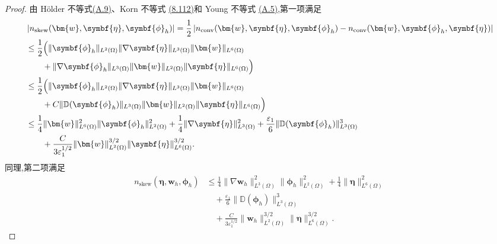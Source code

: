 \begin{lemma}[非线性对流项的估计]
\begin{proof}
由 Hölder 不等式\hyperref[eq:appendix-a-9]{(A.9)}、Korn 不等式
\hyperref[eq:smagorinsky-generalized-korn-inequality]{(8.112)}和 Young 不等式
\hyperref[eq:appendix-a-5]{(A.5)},第一项满足
\begin{equation}\label{eq:smagorinsky-error-convection-first-bound}
\begin{aligned}
&\left|n_{\mathrm{skew}}(\bm{w},\symbf{\eta},\symbf{\phi}_h)\right|
 =\frac12\left|n_{\mathrm{conv}}(\bm{w},\symbf{\eta},\symbf{\phi}_h)
 -n_{\mathrm{conv}}(\bm{w},\symbf{\phi}_h,\symbf{\eta})\right|\\
&\le\frac12\Bigl(\|\symbf{\phi}_h\|_{L^2(\Omega)}
       \|\nabla\symbf{\eta}\|_{L^3(\Omega)}\|\bm{w}\|_{L^6(\Omega)}\\
&\qquad+\|\nabla\symbf{\phi}_h\|_{L^3(\Omega)}
       \|\bm{w}\|_{L^2(\Omega)}\|\symbf{\eta}\|_{L^6(\Omega)}\Bigr)\\
&\le\frac12\Bigl(\|\symbf{\phi}_h\|_{L^2(\Omega)}
       \|\nabla\symbf{\eta}\|_{L^3(\Omega)}\|\bm{w}\|_{L^6(\Omega)}\\
&\qquad+C\|\mathbb{D}(\symbf{\phi}_h)\|_{L^3(\Omega)}
       \|\bm{w}\|_{L^2(\Omega)}\|\symbf{\eta}\|_{L^6(\Omega)}\Bigr)\\
&\le\frac14\|\bm{w}\|_{L^6(\Omega)}^2
       \|\symbf{\phi}_h\|_{L^2(\Omega)}^2
 +\frac14\|\nabla\symbf{\eta}\|_{L^3(\Omega)}^2
 +\frac{\varepsilon_1}{6}
       \|\mathbb{D}(\symbf{\phi}_h)\|_{L^3(\Omega)}^3\\
&\qquad+\frac{C}{3\varepsilon_1^{1/2}}
       \|\bm{w}\|_{L^2(\Omega)}^{3/2}
       \|\symbf{\eta}\|_{L^6(\Omega)}^{3/2}.
\end{aligned}
\end{equation}
同理,第二项满足
\begin{equation}\label{eq:smagorinsky-error-convection-second-bound}
\begin{aligned}
n_{\mathrm{skew}}(\symbf{\eta},\bm{w}_h,\symbf{\phi}_h)
&\le\frac14\|\nabla\bm{w}_h\|_{L^3(\Omega)}^2
       \|\symbf{\phi}_h\|_{L^2(\Omega)}^2
 +\frac14\|\symbf{\eta}\|_{L^6(\Omega)}^2\\
&\quad+\frac{\varepsilon_1}{6}
       \|\mathbb{D}(\symbf{\phi}_h)\|_{L^3(\Omega)}^3\\
&\quad+\frac{C}{3\varepsilon_1^{1/2}}
       \|\bm{w}_h\|_{L^2(\Omega)}^{3/2}
       \|\symbf{\eta}\|_{L^6(\Omega)}^{3/2}.
\end{aligned}
\end{equation}


\end{proof}
\end{lemma}
